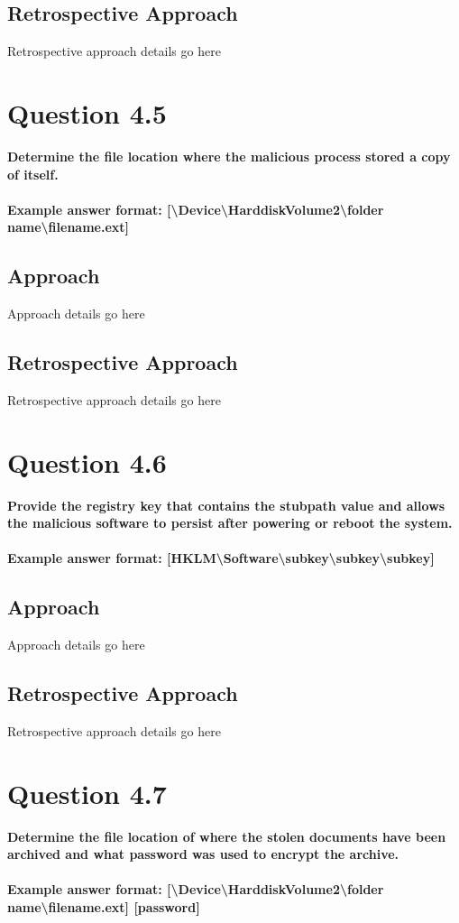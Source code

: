 \subsection{Retrospective Approach}
Retrospective approach details go here

\section{Question 4.5}
\textbf{Determine the file location where the malicious process stored a copy of
itself.
\\\\
Example answer format:
[\textbackslash{}Device\textbackslash{}HarddiskVolume2\textbackslash{}folder
name\textbackslash{}filename.ext]}
\subsection{Approach}
Approach details go here
\subsection{Retrospective Approach}
Retrospective approach details go here

\section{Question 4.6}
\textbf{Provide the registry key that contains the stubpath value and allows the
malicious software to persist after powering or reboot the system.
\\\\
Example answer format:
[HKLM\textbackslash{}Software\textbackslash{}subkey\textbackslash{}subkey\textbackslash{}subkey]}
\subsection{Approach}
Approach details go here
\subsection{Retrospective Approach}
Retrospective approach details go here

\section{Question 4.7}
\textbf{Determine the file location of where the stolen documents have been
archived and what password was used to encrypt the archive.
\\\\
Example answer format:
[\textbackslash{}Device\textbackslash{}HarddiskVolume2\textbackslash{}folder
name\textbackslash{}filename.ext] [password]}

